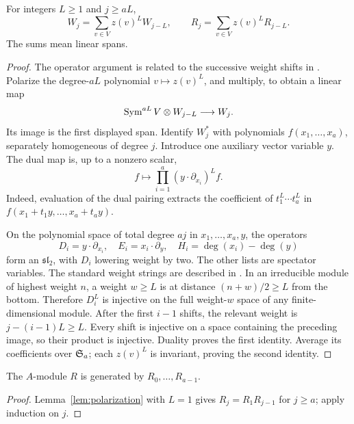 \begin{lemma}[Polarization]\label{lem:polarization}
For integers \(L\ge1\) and \(j\ge aL\),
\[
       W_j=\sum_{v\in V}z(v)^L W_{j-L},
       \qquad
       R_j=\sum_{v\in V}z(v)^L R_{j-L}.
\]
The sums mean linear spans.
\end{lemma}
\begin{proof}
The operator argument is related to the successive weight shifts in
\cite[Section~5]{Ikenmeyer2015}. Polarize the degree-\(aL\) polynomial
\(v\mapsto z(v)^L\), and multiply, to obtain a linear map
\[
                 \operatorname{Sym}^{aL}V\otimes W_{j-L}\longrightarrow W_j.
\]
Its image is the first displayed span. Identify \(W_j^*\) with
polynomials \(f(x_1,\ldots,x_a)\), separately homogeneous of degree \(j\).
Introduce one auxiliary vector variable \(y\). The dual map is, up to a nonzero scalar,
\[
                f\longmapsto\prod_{i=1}^a
                       (y\cdot\partial_{x_i})^L f.
\]
Indeed, evaluation of the dual pairing extracts the coefficient of
\(t_1^L\cdots t_a^L\) in \(f(x_1+t_1y,\ldots,x_a+t_ay)\).

On the polynomial space of total degree \(aj\) in
\(x_1,\ldots,x_a,y\), the operators
\[
 D_i=y\cdot\partial_{x_i},\quad
 E_i=x_i\cdot\partial_y,\quad
 H_i=\deg(x_i)-\deg(y)
\]
form an \(\mathfrak{sl}_2\), with \(D_i\) lowering weight by two.
The other lists are spectator variables. The standard weight strings
are described in \cite[Section~11.1, (11.5)]{FultonHarris1991}.
In an irreducible module of highest weight \(n\), a weight \(w\ge L\)
is at distance \((n+w)/2\ge L\) from the bottom. Therefore \(D_i^L\)
is injective on the full weight-\(w\) space of any finite-dimensional
module. After the first \(i-1\) shifts, the relevant weight is
\(j-(i-1)L\ge L\). Every shift is injective on a space containing the
preceding image, so their product is injective. Duality proves the
first identity. Average its coefficients over \(\mathfrak S_a\); each
\(z(v)^L\) is invariant, proving the second identity.
\end{proof}

\begin{corollary}\label{cor:module-generation}
The \(A\)-module \(R\) is generated by \(R_0,\ldots,R_{a-1}\).
\end{corollary}
\begin{proof}
Lemma~\ref{lem:polarization} with \(L=1\) gives
\(R_j=R_1R_{j-1}\) for \(j\ge a\); apply induction on \(j\).
\end{proof}

